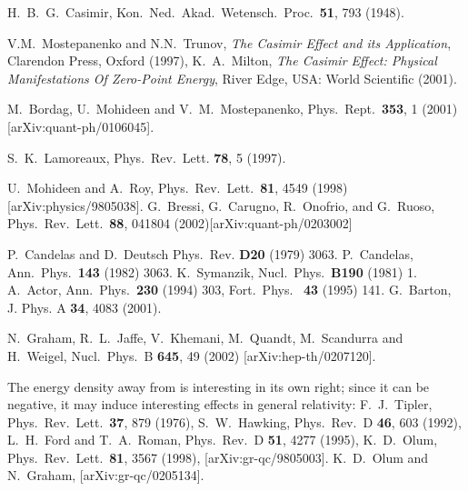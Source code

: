 \documentclass[a4paper,aps,amsfonts,prl,showpacs,nobibnotes,nofootinbib,%
tightenlines,twocolumn]{revtex4}
\begin{document}
\begin{thebibliography}{99}

 H.\ B.\ G.\ Casimir, 
Kon.\ Ned.\ Akad.\ Wetensch.\ Proc.\ {\bf 51}, 793 (1948).

V.M.\ Mostepanenko and N.N.\ Trunov, \textsl{The Casimir
Effect and its Application}, Clarendon Press, Oxford (1997),
K.\ A.\ Milton, \textsl{The Casimir Effect: Physical Manifestations Of
Zero-Point Energy}, River Edge, USA: World Scientific (2001).

M.\ Bordag, U.\ Mohideen and V.\ M.\ Mostepanenko,
Phys.\ Rept.\ \textbf{353}, 1 (2001)  [arXiv:quant-ph/0106045].

 S.\ K.\ Lamoreaux, Phys.\ Rev.\ Lett. {\bf 78}, 5 (1997).

U.\ Mohideen and A.\ Roy, Phys.\ Rev.\ Lett.\ {\bf 81}, 4549 (1998)
[arXiv:physics/9805038].
G.\ Bressi, G.\ Carugno, R.\ Onofrio, and G.\ Ruoso, Phys.\
Rev.\ Lett.\ {\bf 88}, 041804 (2002)[arXiv:quant-ph/0203002]

P.\ Candelas and D.\ Deutsch Phys.\ Rev.  {\bf D20}
 (1979) 3063.
P.\ Candelas, Ann.\ Phys.\ {\bf 143} (1982) 3063.
\bibitem{Symanzik}K.\ Symanzik,  Nucl.\  Phys.\ {\bf B190} (1981) 1.
\bibitem{Actor} A.~Actor, Ann.~Phys.~{\bf 230} (1994) 303, Fort.~Phys.~{\bf
	43} (1995) 141.
 G.\ Barton, J. Phys.  A {\bf 34}, 4083 (2001).

N.~Graham, R.~L.~Jaffe, V.~Khemani, M.~Quandt, M.~Scandurra and H.~Weigel,
Nucl.\ Phys.\ B {\bf 645}, 49 (2002)
[arXiv:hep-th/0207120].

The energy density away from \coordHE{}
is interesting in its own right; since it can be negative, it may
induce interesting effects in general relativity: 
F.\ J.\ Tipler, Phys.\ Rev.\ Lett.\ {\bf 37}, 879 (1976),
S.\ W.\ Hawking, Phys.\ Rev.\ D {\bf 46}, 603 (1992),
L.\ H.\ Ford and T.\ A.\ Roman, Phys.\ Rev.\ D {\bf 51}, 4277 (1995),
K.\ D.\ Olum, Phys.\ Rev.\ Lett.\ {\bf 81}, 3567 (1998),
[arXiv:gr-qc/9805003].
K.\ D.\ Olum and N.\ Graham, [arXiv:gr-qc/0205134].


\end{thebibliography}
\end{document}
